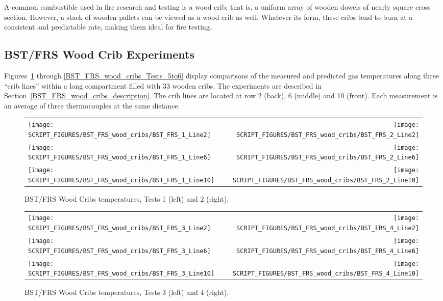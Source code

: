 A common combustible used in fire research and testing is a wood crib; that is, a uniform array of wooden dowels of nearly square cross section. However, a stack of wooden pallets can be viewed as a wood crib as well. Whatever its form, these cribs tend to burn at a consistent and predictable rate, making them ideal for fire testing.

\newpage

\subsection{BST/FRS Wood Crib Experiments}
\label{BST_FRS_wood_cribs_temperature}

Figures~\ref{BST_FRS_wood_cribs_Tests_1to2} through \ref{BST_FRS_wood_cribs_Tests_5to6} display comparisons of the measured and predicted gas temperatures along three ``crib lines'' within a long compartment filled with 33 wooden cribs. The experiments are described in Section~\ref{BST_FRS_wood_cribs_description}. The crib lines are located at row 2 (back), 6 (middle) and 10 (front). Each measurement is an average of three thermocouples at the same distance.

\begin{figure}[!h]
\begin{tabular*}{\textwidth}{l@{\extracolsep{\fill}}r}
\texttt{[image: SCRIPT\_FIGURES/BST\_FRS\_wood\_cribs/BST\_FRS\_1\_Line2]} &
\texttt{[image: SCRIPT\_FIGURES/BST\_FRS\_wood\_cribs/BST\_FRS\_2\_Line2]} \\
\texttt{[image: SCRIPT\_FIGURES/BST\_FRS\_wood\_cribs/BST\_FRS\_1\_Line6]} &
\texttt{[image: SCRIPT\_FIGURES/BST\_FRS\_wood\_cribs/BST\_FRS\_2\_Line6]} \\
\texttt{[image: SCRIPT\_FIGURES/BST\_FRS\_wood\_cribs/BST\_FRS\_1\_Line10]} &   
\texttt{[image: SCRIPT\_FIGURES/BST\_FRS\_wood\_cribs/BST\_FRS\_2\_Line10]}
\end{tabular*}
\caption[BST/FRS Wood Cribs temperatures, Tests 1 and 2]{BST/FRS Wood Cribs temperatures, Tests 1 (left) and 2 (right).}
\label{BST_FRS_wood_cribs_Tests_1to2}
\end{figure}

\begin{figure}[p]
\begin{tabular*}{\textwidth}{l@{\extracolsep{\fill}}r}
\texttt{[image: SCRIPT\_FIGURES/BST\_FRS\_wood\_cribs/BST\_FRS\_3\_Line2]} &
\texttt{[image: SCRIPT\_FIGURES/BST\_FRS\_wood\_cribs/BST\_FRS\_4\_Line2]} \\
\texttt{[image: SCRIPT\_FIGURES/BST\_FRS\_wood\_cribs/BST\_FRS\_3\_Line6]} & 
\texttt{[image: SCRIPT\_FIGURES/BST\_FRS\_wood\_cribs/BST\_FRS\_4\_Line6]} \\
\texttt{[image: SCRIPT\_FIGURES/BST\_FRS\_wood\_cribs/BST\_FRS\_3\_Line10]} &
\texttt{[image: SCRIPT\_FIGURES/BST\_FRS\_wood\_cribs/BST\_FRS\_4\_Line10]}    
\end{tabular*}
\caption[BST/FRS Wood Cribs temperatures, Tests 3 and 4]{BST/FRS Wood Cribs temperatures, Tests 3 (left) and 4 (right).}
\label{BST_FRS_wood_cribs_Tests_3to4}
\end{figure}

